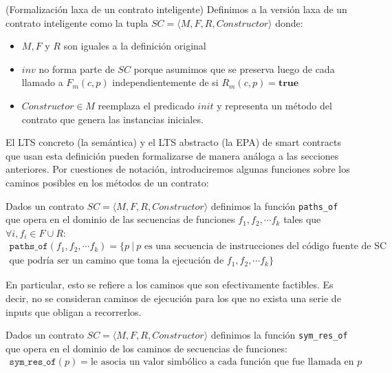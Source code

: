 \begin{definition}(Formalización laxa de un contrato inteligente)
    \label{definicion-laxa-smart-contract}
    Definimos a la versión laxa de un contrato inteligente como la tupla $SC = \langle M, F, R, Constructor \rangle$ donde:
    \begin{itemize}
        \item $M, F$ y $R$ son iguales a la definición original
        \item $inv$ no forma parte de $SC$ porque asumimos que se preserva luego de cada llamado a $F_m(c,p)$ independientemente de si $R_m(c,p) = \textbf{true}$
        \item $Constructor \in M$ reemplaza el predicado $init$ y representa un método del contrato que genera las instancias iniciales.
    \end{itemize}
\end{definition}
El LTS concreto (la semántica) y el LTS abstracto (la EPA) de smart contracts que usan esta definición pueden formalizarse de manera análoga a las secciones anteriores.
Por cuestiones de notación, introduciremos algunas funciones sobre los caminos posibles en los métodos de un contrato:
\begin{definition}
    Dados un contrato $SC = \langle M, F, R, Constructor \rangle$ definimos la función \texttt{paths\_of} que opera en el dominio de las secuencias de funciones $f_1, f_2, \cdots f_k$ tales que $\forall i, f_i \in F \cup R$:
    \begin{multline}
        \texttt{paths\_of}(f_1, f_2, \cdots f_k) = \{p \: | \: p \text{ es una secuencia de instrucciones del código fuente de SC} \\
        \text{que podría ser un camino que toma la ejecución de } f_1, f_2, \cdots f_k \}
    \end{multline}
\end{definition}
En particular, esto se refiere a los caminos que son efectivamente factibles.
Es decir, no se consideran caminos de ejecución para los que no exista una serie de inputs que obligan a recorrerlos.
\begin{definition}
    Dados un contrato $SC = \langle M, F, R, Constructor \rangle$ definimos la función \texttt{sym\_res\_of} que opera en el dominio de los caminos de secuencias de funciones:
    \begin{multline}
        \texttt{sym\_res\_of}(p) = \text{le asocia un valor simbólico a cada función que fue llamada en }p
    \end{multline}
\end{definition}

